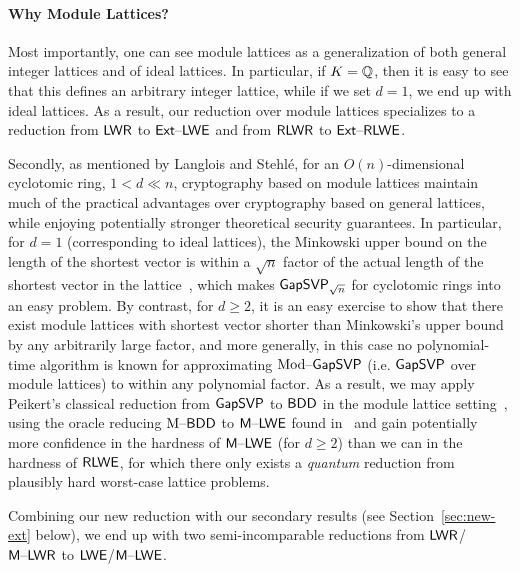 \paragraph{Why Module Lattices?} Most importantly, one can see module lattices as a generalization of both
general integer lattices and of
ideal lattices. In particular, if $K=\mathbb{Q}$, then it is easy to see that
this defines an arbitrary integer lattice, while if we set
$d=1$, we end up with ideal lattices. As a result, our reduction over
module lattices specializes to a reduction from $\mathsf{LWR}$ to $\mathsf{Ext \text{\textendash} LWE}$
and from $\mathsf{RLWR}$ to $\mathsf{Ext \text{\textendash} RLWE}$. 

Secondly, as mentioned by Langlois and
Stehl{\'{e}}, for an $O(n)$-dimensional cyclotomic ring, $1 < d \ll
n$, cryptography based on module lattices maintain much of the
practical advantages over cryptography based on general lattices,
while enjoying potentially stronger theoretical security
guarantees. In particular, for $d=1$ (corresponding to ideal
lattices), the Minkowski upper bound on the length of the shortest
vector is within a $\sqrt{n}$ factor of the actual length of the
shortest vector in the
lattice~\cite{DBLP:journals/jacm/LyubashevskyPR13}, which makes
$\mathsf{GapSVP}_{\sqrt{n}}$ for cyclotomic rings into an easy problem. By
contrast, for $d \geq 2$, it is an easy exercise to show that there
exist module lattices with shortest vector shorter than Minkowski's
upper bound by any arbitrarily large factor, and more generally, in
this case no polynomial-time algorithm is known for approximating
$\text{Mod}\text{\textendash}\mathsf{GapSVP}$ (i.e. $\mathsf{GapSVP}$ over module lattices) to within
any polynomial factor. As a result, we may apply Peikert's classical
reduction from $\mathsf{GapSVP}$ to $\mathsf{BDD}$ in the module lattice
setting~\cite{DBLP:conf/stoc/Peikert09}, using the oracle reducing
$\text{M}\text{\textendash}\mathsf{BDD}$ to $\mathsf{M \text{\textendash} LWE}$ found
in~\cite{DBLP:journals/dcc/LangloisS15} and gain potentially more
confidence in the hardness of $\mathsf{M \text{\textendash} LWE}$ (for $d\geq 2$) than we can in
the hardness of $\mathsf{RLWE}$, for which there only exists a \emph{quantum}
reduction from plausibly hard worst-case lattice
problems. 



Combining our new reduction with our secondary results (see
Section~\ref{sec:new-ext} below), we end up with two semi-incomparable
reductions from $\mathsf{LWR}$/$\mathsf{M \text{\textendash} LWR}$ to $\mathsf{LWE}$/$\mathsf{M \text{\textendash} LWE}$. 

